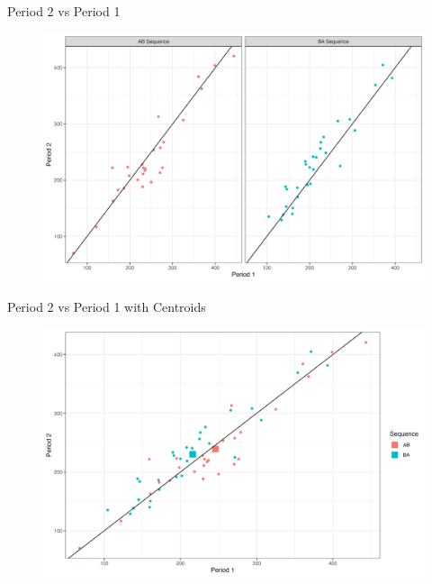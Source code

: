 \documentclass{beamer}
\begin{document}
\begin{frame}{Period 2 vs Period 1}
    \begin{figure}
        \centering
        \includegraphics[width=\linewidth]{report/figures/ch2/periodsPlot.png}
    \end{figure}
\end{frame}

\begin{frame}{Period 2 vs Period 1 with Centroids}
    \begin{figure}
        \centering
        \includegraphics[width=\linewidth]{report/figures/ch2/centroidsPlot.png}
    \end{figure}
\end{frame}
\end{document}
